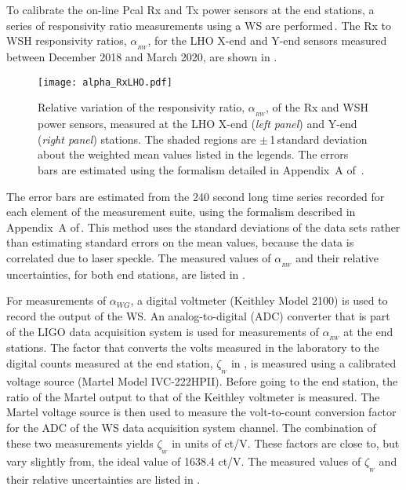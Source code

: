 \documentclass[12pt,a4paper,final]{iopart}
\begin{document}
%
To calibrate the on-line Pcal Rx and Tx power sensors at the end stations, a series of responsivity ratio measurements using a WS are performed\,\cite{end_station_index}. The Rx to WSH responsivity ratios, $\alpha_{_{RW}}$, for the LHO X-end and Y-end sensors measured between  December 2018 and March 2020, are shown in  .
%
\begin{figure}[t]%
    \begin{center}
\texttt{[image: alpha\_RxLHO.pdf]}
    \caption{Relative variation of the responsivity ratio, $\alpha_{_{RW}}$, of the Rx and WSH power sensors, measured at the LHO X-end ({\em left panel}) and Y-end ({\em right panel}) stations. The shaded regions are $\pm$\,1\,standard deviation about the weighted mean values listed in the legends.  The errors bars are estimated using the formalism detailed in Appendix~A of~\cite{P1900127}.}
    \label{fig:alphaRWLHO}
    \end{center}
\end{figure}
%
The error bars are estimated from the 240 second long time series recorded for each element of the measurement suite, using the formalism described in Appendix~A of\,\cite{P1900127}.  This method uses the standard deviations of the data sets rather than estimating standard errors on the mean values,  because the data is correlated due to laser speckle.  The measured values of $\alpha_{_{RW}}$ and their  relative uncertainties, for both end stations,  are listed in .

For measurements of $\alpha_{WG}$, a digital voltmeter (Keithley Model 2100) is used to record the output of the WS. An analog-to-digital (ADC) converter that is part of the LIGO data acquisition system is used for measurements of $\alpha_{_{RW}}$ at the end stations.  The factor that converts the volts measured in the laboratory to the digital counts measured at the end station, $\zeta_{_{W}}$ in , is measured using a calibrated voltage source (Martel Model IVC-222HPII). Before going to the end station, the ratio of the Martel output to that of the Keithley voltmeter is measured.  The Martel voltage source is then used to measure the volt-to-count conversion factor for the ADC of the WS data acquisition system  channel.  The combination of these two measurements yields $\zeta_{_{W}}$ in units of ct/V. These factors are close to, but vary slightly from, the ideal value of 1638.4 ct/V.  The measured values of $\zeta_{_{W}}$ and their relative uncertainties are listed in .
\end{document}
